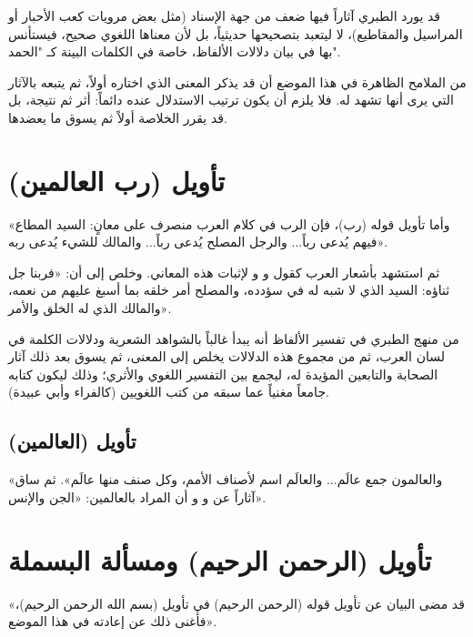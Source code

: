 \begin{fawaid}
قد يورد الطبري آثاراً فيها ضعف من جهة الإسناد (مثل بعض مرويات كعب الأحبار أو المراسيل والمقاطيع)، لا ليتعبد بتصحيحها حديثياً، بل لأن معناها اللغوي صحيح، فيستأنس بها في بيان دلالات الألفاظ، خاصة في الكلمات البينة كـ "الحمد".
\end{fawaid}

\begin{fawaid}
من الملامح الظاهرة في هذا الموضع أن  قد يذكر المعنى الذي اختاره أولاً، ثم يتبعه بالآثار التي يرى أنها تشهد له. فلا يلزم أن يكون ترتيب الاستدلال عنده دائماً: أثر ثم نتيجة، بل قد يقرر الخلاصة أولاً ثم يسوق ما يعضدها.
\end{fawaid}

\separator

\section{تأويل (رب العالمين)}
 «وأما تأويل قوله (رب)، فإن الرب في كلام العرب منصرف على معانٍ: السيد المطاع فيهم يُدعى رباً... والرجل المصلح يُدعى رباً... والمالك للشيء يُدعى ربه».

ثم استشهد  بأشعار العرب كقول  و و لإثبات هذه المعاني. وخلص إلى أن: «فربنا جل ثناؤه: السيد الذي لا شبه له في سؤدده، والمصلح أمر خلقه بما أسبغ عليهم من نعمه، والمالك الذي له الخلق والأمر».

\begin{fawaid}
من منهج الطبري في تفسير الألفاظ أنه يبدأ غالباً بالشواهد الشعرية ودلالات الكلمة في لسان العرب، ثم من مجموع هذه الدلالات يخلص إلى المعنى، ثم يسوق بعد ذلك آثار الصحابة والتابعين المؤيدة له، ليجمع بين التفسير اللغوي والأثري؛ وذلك ليكون كتابه جامعاً مغنياً عما سبقه من كتب اللغويين (كالفراء وأبي عبيدة).
\end{fawaid}

\subsection{تأويل (العالمين)}
 «والعالمون جمع عالَم... والعالَم اسم لأصناف الأمم، وكل صنف منها عالَم».
ثم ساق آثاراً عن  و و أن المراد بالعالمين: «الجن والإنس».

\separator

\section{تأويل (الرحمن الرحيم) ومسألة البسملة}
 «قد مضى البيان عن تأويل قوله (الرحمن الرحيم) في تأويل (بسم الله الرحمن الرحيم)، فأغنى ذلك عن إعادته في هذا الموضع».

